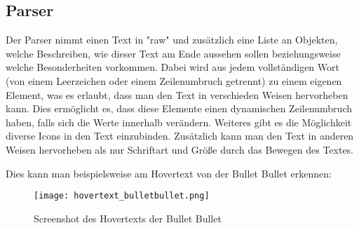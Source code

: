 
\renewcommand{\kapitelautor}{Autor: Felix Zwickelstorfer}
\subsection{Parser}\label{subsec:parser}
\renewcommand{\kapitelautor}{Autor: Felix Zwickelstorfer}

Der Parser nimmt einen Text in "raw" und zusätzlich eine Liste an Objekten, welche Beschreiben, wie dieser Text am Ende aussehen sollen beziehungsweise welche Besonderheiten vorkommen.
Dabei wird aus jedem vollständigen Wort (von einem Leerzeichen oder einem Zeilenumbruch getrennt) zu einem eigenen Element, was es erlaubt, dass man den Text in verschieden Weisen hervorheben kann.
Dies ermöglicht es, dass diese Elemente einen dynamischen Zeilenumbruch haben, falls sich die Werte innerhalb verändern.
Weiteres gibt es die Möglichkeit diverse Icons in den Text einzubinden.
Zusätzlich kann man den Text in anderen Weisen hervorheben als nur Schriftart und Größe durch \zB das Bewegen des Textes.

Dies kann man beispielsweise am Hovertext von der Bullet Bullet erkennen:
\begin{figure}[H]
    \centering
    \texttt{[image: hovertext\_bulletbullet.png]}
    \caption{Screenshot des Hovertexts der Bullet Bullet}
\end{figure}


